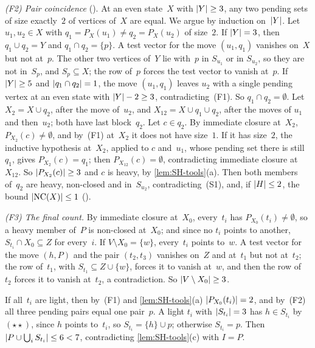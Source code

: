 \begin{outline}
\emph{(F2) Pair coincidence} (). At an even state~$X$ with $\lvert Y \rvert\ge3$, any two pending sets of size exactly~$2$ of
vertices of~$X$ are equal. We argue by induction on~$\lvert Y \rvert$. Let $u_1,u_2\in X$ with $q_1=P_X(u_1)\ne q_2=P_X(u_2)$ of
size~$2$. If $\lvert Y \rvert=3$, then
$q_1\cup q_2=Y$ and $q_1\cap q_2=\{p\}$. A test vector for the move $(u_1,q_1)$ vanishes on~$X$ but not at~$p$. The other two
vertices of~$Y$ lie with~$p$ in $S_{u_1}$ or in $S_{u_2}$, so they are not in~$S_p$, and $S_p\subseteq X$; the row of~$p$ forces
the test vector to vanish at~$p$. If $\lvert Y \rvert\ge5$ and $\lvert q_1\cap q_2 \rvert=1$, the move $(u_1,q_1)$ leaves $u_2$ with a single
pending vertex at an even state with $\lvert Y \rvert-2\ge3$, contradicting~(F1). So $q_1\cap q_2=\emptyset$. Let $X_2=X\cup q_2$, after
the move of~$u_2$, and $X_{12}=X\cup q_1\cup q_2$, after the moves of $u_1$ and then~$u_2$; both have last block~$q_2$. Let
$c\in q_2$. By immediate closure at~$X_2$, $P_{X_2}(c)\ne\emptyset$, and by~(F1) at~$X_2$ it does not have size~$1$. If it has
size~$2$, the inductive hypothesis at~$X_2$, applied to $c$ and~$u_1$, whose pending set there is still~$q_1$, gives
$P_{X_2}(c)=q_1$; then $P_{X_{12}}(c)=\emptyset$, contradicting immediate closure at~$X_{12}$. So $\lvert P_{X_2}(c) \rvert\ge3$ and $c$
is heavy, by \cref{lem:SH-tools}(a). Then both members of~$q_2$ are heavy, non-closed and in~$S_{u_2}$, contradicting~(S1),
and, if $\lvert H \rvert\le2$, the bound $\lvert \mathrm{NC}(X) \rvert\le1$ ().

\emph{(F3) The final count.} By immediate closure at~$X_0$, every~$t_i$ has $P_{X_0}(t_i)\ne\emptyset$, so a heavy member
of~$P$ is non-closed at~$X_0$; and since no $t_i$ points to another, $S_{t_i}\cap X_0\subseteq Z$ for every~$i$. If $V\setminus X_0=\{w\}$, every~$t_i$ points
to~$w$. A test vector for the move $(h,P)$ and the pair $(t_2,t_3)$ vanishes on~$Z$ and at~$t_1$ but not at~$t_2$; the row
of~$t_1$, with $S_{t_1}\subseteq Z\cup\{w\}$, forces it to vanish at~$w$, and then the row of~$t_2$ forces it to vanish at~$t_2$,
a contradiction. So $\lvert V\setminus X_0 \rvert\ge3$.

If all~$t_i$ are light, then by~(F1) and \cref{lem:SH-tools}(a) $\lvert P_{X_0}(t_i) \rvert=2$, and by~(F2) all three pending pairs
equal one pair~$p$. A light $t_i$ with $\lvert S_{t_i} \rvert=3$ has $h\in S_{t_i}$ by $(\star\star)$, since $h$ points to~$t_i$, so
$S_{t_i}=\{h\}\cup p$; otherwise $S_{t_i}=p$. Then $\lvert P\cup\bigcup_iS_{t_i} \rvert\le6<7$, contradicting \cref{lem:SH-tools}(c)
with $I=P$.


\end{outline}
